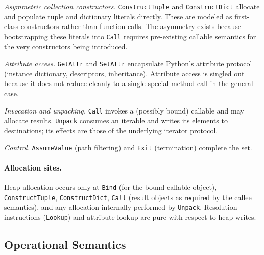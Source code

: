 \smallskip
\noindent\emph{Asymmetric collection constructors.}
\texttt{ConstructTuple} and \texttt{ConstructDict} allocate and populate tuple and dictionary literals directly. These are modeled as first-class constructors rather than function calls. The asymmetry exists because bootstrapping these literals into \texttt{Call} requires pre-existing callable semantics for the very constructors being introduced.

\smallskip
\noindent\emph{Attribute access.}
\texttt{GetAttr} and \texttt{SetAttr} encapsulate Python’s attribute protocol (instance dictionary, descriptors, inheritance). Attribute access is singled out because it does not reduce cleanly to a single special-method call in the general case.

\smallskip
\noindent\emph{Invocation and unpacking.}
\texttt{Call} invokes a (possibly bound) callable and may allocate results. \texttt{Unpack} consumes an iterable and writes its elements to destinations; its effects are those of the underlying iterator protocol.

\smallskip
\noindent\emph{Control.}
\texttt{AssumeValue} (path filtering) and \texttt{Exit} (termination) complete the set.

\paragraph{Allocation sites.}
Heap allocation occurs only at \texttt{Bind} (for the bound callable object), \texttt{ConstructTuple}, \texttt{ConstructDict}, \texttt{Call} (result objects as required by the callee semantics), and any allocation internally performed by \texttt{Unpack}. Resolution instructions (\texttt{Lookup\*}) and attribute lookup are pure with respect to heap writes.

\subsection{Operational Semantics}

